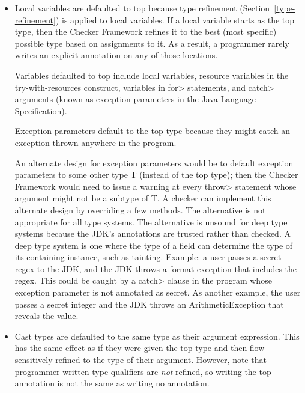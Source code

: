 \begin{itemize}
\item
Local variables are defaulted to top because type refinement
(Section~\ref{type-refinement}) is applied to local variables.  If a local
variable starts as the top type, then the Checker Framework refines it to
the best (most specific) possible type based on assignments to it.  As a
result, a programmer rarely writes an explicit annotation on any of those
locations.

Variables defaulted to top include local variables, resource variables in the
try-with-resources construct, variables in \<for> statements, and \<catch>
arguments (known as exception parameters in the Java Language Specification).

Exception parameters default to the top type because they might catch an
exception thrown anywhere in the program.

An alternate design for exception parameters would be to default exception
parameters to some other type T (instead of the top type); then the Checker
Framework would need to issue a warning at every \<throw> statement whose
argument might not be a subtype of T\@.  A checker can implement this
alternate design by overriding a few methods.  The alternative is not
appropriate for all type systems.  The alternative is unsound for deep type
systems because the JDK's annotations are trusted rather than checked.  A
deep type system is one where the type of a field can determine the type of
its containing instance, such as tainting.  Example: a user passes a secret
regex to the JDK, and the JDK throws a format exception that includes the
regex.  This could be caught by a \<catch> clause in the program whose
exception parameter is not annotated as secret.  As another example, the
user passes a secret integer and the JDK throws an ArithmeticException
that reveals the value.


\item
Cast types are defaulted to the same type as their argument expression.
This has the same effect as if they were given the
top type and then flow-sensitively refined to the type of their argument.
However, note that programmer-written type qualifiers are \emph{not}
refined, so writing the top annotation is not the same as writing no annotation.


\end{itemize}
